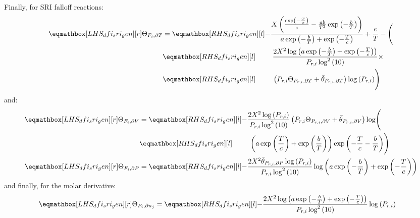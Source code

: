 \documentclass[12pt,number,sort&compress]{elsarticle}
\begin{document}
Finally, for SRI falloff reactions:
\begin{align}
 \label{e:dfi_sri_dt_prod}
 \lhs{dfi_sri_gen}{\Theta_{F_i, \partial T}} &=
 \rhs{dfi_sri_gen}{- \frac{X \left(\frac{\operatorname{exp}\left({- \frac{T}{c}}\right)}{c} - \frac{a b}{T^{2}} \operatorname{exp}\left({- \frac{b}{T}}\right)\right)}{a \operatorname{exp}\left({- \frac{b}{T}}\right) + \operatorname{exp}\left({- \frac{T}{c}}\right)} + \frac{e}{T} - \Biggl(} \nonumber \\
 &\rhs{dfi_sri_gen}{\mathindent \frac{2 X^{2} \log{\left (a \operatorname{exp}\left({- \frac{b}{T}}\right) + \operatorname{exp}\left({- \frac{T}{c}}\right) \right )}}{P_{r, i} \log^{2}{\left (10 \right )}} \times } \nonumber \\
 &\rhs{dfi_sri_gen}{\mathindent \left(P_{r, i} \Theta_{P_{r,i}, \partial T} + \bar{\theta}_{P_{r, i}, \partial T}\right) \log{\left (P_{r, i} \right ) \Biggr)}}
\end{align}
and:
\begin{subequations}
 \label{e:dfi_sri_de_prod}
 \begin{align}
  \lhs{dfi_sri_gen}{\Theta_{F_i, \partial V}} &=
  \rhs{dfi_sri_gen}{- \frac{2 X^{2} \log{\left (P_{r, i} \right )}}{P_{r, i} \log^{2}{\left (10 \right )}} \left(P_{r, i} \Theta_{P_{r,i}, \partial V} + \bar{\theta}_{P_{r, i}, \partial V}\right) \log \Biggl(} \nonumber \\
& \rhs{dfi_sri_gen}{\mathindent \left( a \operatorname{exp}\left({\frac{T}{c}}\right) + \operatorname{exp}\left({\frac{b}{T}}\right)\right) \operatorname{exp}\left({- \frac{T}{c} - \frac{b}{T}}\right) \Biggr)} \\
  \lhs{dfi_sri_gen}{\Theta_{F_i, \partial P}} &=
  \rhs{dfi_sri_gen}{- \frac{2 X^{2} \bar{\theta}_{P_{r, i}, \partial P} \log{\left (P_{r, i} \right )}}{P_{r, i} \log^{2}{\left (10 \right )}} \log{\left (a \operatorname{exp}\left({- \frac{b}{T}}\right) + \operatorname{exp}\left({- \frac{T}{c}}\right) \right )}}
 \end{align}
\end{subequations}
and finally, for the molar derivative:
\begin{align}
 \label{e:dfi_sri_dnj_prod}
 \lhs{dfi_sri_gen}{\Theta_{F_i, \partial n_j}} &= \rhs{dfi_sri_gen}{- \frac{2 X^{2} \log{\left (a \operatorname{exp}\left({- \frac{b}{T}}\right) + \operatorname{exp}\left({- \frac{T}{c}}\right) \right )}}{P_{r, i} \log^{2}{\left (10 \right )}} \log{\left (P_{r, i} \right )}}
\end{align}
\end{document}
